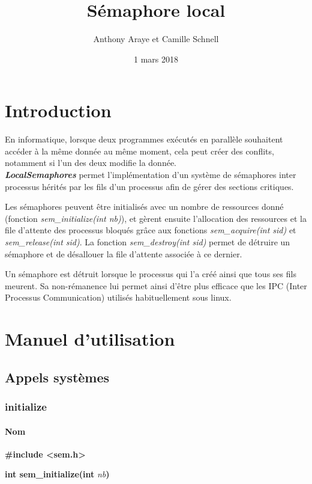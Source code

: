 \documentclass[12pt]{article}
\title{Sémaphore local}
\author{Anthony Araye et Camille Schnell}
\date{1 mars 2018}
\begin{document}
\maketitle
\renewcommand{\contentsname}{Sommaire}
\tableofcontents
\newpage
\section{Introduction}
    En informatique, lorsque deux programmes exécutés en parallèle souhaitent accéder à la même donnée au même moment, cela peut créer des conflits, notamment si l'un des deux modifie la donnée. \\

    \textit{\textbf{LocalSemaphores}} permet l'implémentation d'un système de sémaphores inter processus hérités par les fils d'un processus afin de gérer des sections critiques.

    Les sémaphores peuvent être initialisés avec un nombre de ressources donné (fonction \textit{sem\_initialize(int nb)}), et gèrent ensuite l'allocation des ressources et la file d'attente des processus bloqués grâce aux fonctions \textit{sem\_acquire(int sid)} et \textit{sem\_release(int sid)}. La fonction \textit{sem\_destroy(int sid)} permet de détruire un sémaphore et de désallouer la file d'attente associée à ce dernier.

    Un sémaphore est détruit lorsque le processus qui l'a créé ainsi que tous ses fils meurent. Sa non-rémanence lui permet ainsi d'être plus efficace que les IPC (Inter Processus Communication) utilisés habituellement sous linux.

\newpage
\section{Manuel d'utilisation}
    \subsection{Appels systèmes}
      \subsubsection{initialize}
          \paragraph{Nom\\}
          \textbf{\#include <sem.h>}

          \textbf{int sem\_initialize(int }\textit{nb}\textbf{)}
\end{document}

